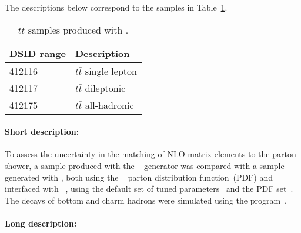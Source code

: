 The descriptions below correspond to the samples in Table~\ref{tab:ttbar_aMCH713}.
\begin{table}[htbp]
\begin{center}
\caption{$t\bar{t}$ samples produced with \MGNLOHER[7.13].}
\label{tab:ttbar_aMCH713}
\begin{tabular}{ l | l }
\hline
DSID range & Description \\
\hline
412116 & $t\bar{t}$ single lepton \\
412117 & $t\bar{t}$ dileptonic \\
412175 & $t\bar{t}$ all-hadronic \\
\hline
\end{tabular}
\end{center}
\end{table}


\paragraph{Short description:}

To assess the uncertainty in the matching of NLO matrix elements to the
parton shower, a sample produced with the
\POWHEGBOX[v2]~\cite{Frixione:2007nw,Nason:2004rx,Frixione:2007vw,Alioli:2010xd}
generator was compared with a sample generated with \MGNLO[2.6.0], both using the 
\NNPDF[3.0nlo]~\cite{Ball:2014uwa} parton distribution function~(PDF) and interfaced with
\HERWIG[7.13]~\cite{Bahr:2008pv,Bellm:2015jjp}, using the \HERWIG[7.1] default set of 
tuned parameters~\cite{Bellm:2015jjp} and the \MMHT[lo] PDF set~\cite{Harland-Lang:2014zoa}.
The decays of bottom and charm hadrons
were simulated using the \EVTGEN[1.6.0] program~\cite{Lange:2001uf}. 

\paragraph{Long description:}

